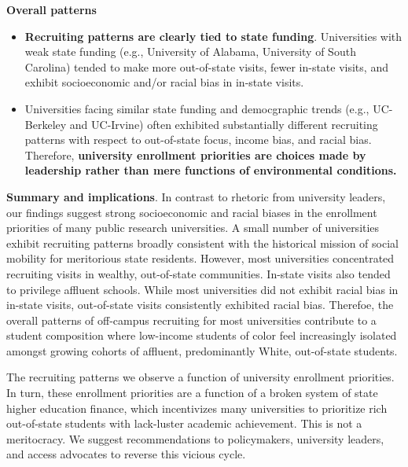 \documentclass[twoside]{article}
\begin{document}
\begin{color-block}[Findings]
\textbf{Overall patterns}
\begin{itemize}
    \item \textbf{Recruiting patterns are clearly tied to state funding}. Universities with weak state funding (e.g., University of Alabama, University of South Carolina) tended to make more out-of-state visits, fewer in-state visits, and exhibit socioeconomic and/or racial bias in in-state visits. %
    \item Universities facing similar state funding and democgraphic trends (e.g., UC-Berkeley and UC-Irvine) often exhibited substantially different recruiting patterns with respect to out-of-state focus, income bias, and racial bias. Therefore, \textbf{university enrollment priorities are choices made by leadership rather than mere functions of environmental conditions.} 
\end{itemize}  

\end{color-block}

\textbf{Summary and implications}. In contrast to rhetoric from university leaders, our findings suggest strong socioeconomic and racial biases in the enrollment priorities of many public research universities. A small number of universities exhibit recruiting patterns broadly consistent with the historical mission of social mobility for meritorious state residents. However, most universities concentrated recruiting visits in wealthy, out-of-state communities. In-state visits also tended to privilege affluent schools. While most universities did not exhibit racial bias in in-state visits, out-of-state visits consistently exhibited racial bias.  Therefoe, the overall patterns of off-campus recruiting for most universities contribute to a student composition where low-income students of color feel increasingly isolated amongst growing cohorts of affluent, predominantly White, out-of-state students.

The recruiting patterns we observe a function of university enrollment priorities. In turn, these enrollment priorities are a function of a broken system of state higher education finance, which incentivizes many universities to prioritize rich out-of-state students with lack-luster academic achievement. This is not a meritocracy.  We suggest recommendations to policymakers, university leaders, and access advocates to reverse this vicious cycle.
\end{document}
